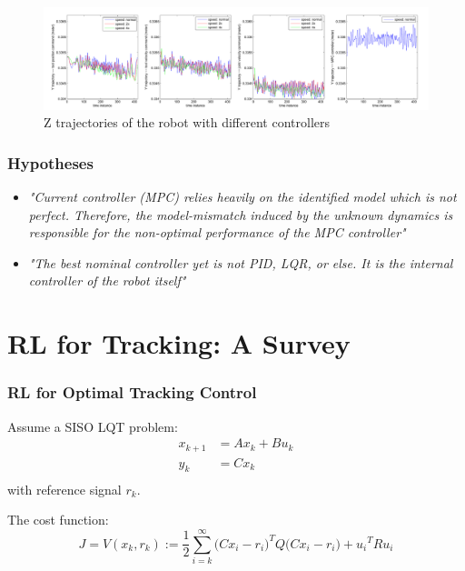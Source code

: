 \documentclass{beamer}
\begin{document}
\begin{frame}
\begin{itemize}
					\begin{figure}
						\centering
						\includegraphics[width=0.9\linewidth]{images/trajectory_data_Z.pdf}
						\caption{\fontsize{8}{4}\selectfont Z trajectories of the robot with different controllers}
						\label{fig:trajectory_data_Z}
					\end{figure}
				\end{itemize}
			\end{frame}		
				
			\begin{frame}\frametitle{Hypotheses}
				\vspace{2mm}
				\begin{itemize}
					\fontsize{8}{4}\selectfont
					\item \textit{"Current controller (MPC) relies heavily on the identified model which is not perfect. Therefore, the model-mismatch induced by the unknown dynamics is responsible for the non-optimal performance of the MPC controller" }
					\vspace{3mm}
					\item \textit{"The best nominal controller yet is not PID, LQR, or else. It is the internal controller of the robot itself"}
					
				\end{itemize}
			\end{frame}
									
			\section{RL for Tracking: A Survey}
			\begin{frame}\frametitle{RL for Optimal Tracking Control}
				
				Assume a SISO LQT problem: \\
				\begin{equation} 
				\begin{split}
				x_{k+1} &= Ax_k + Bu_k \\
				y_k &= Cx_k \\
				\end{split}
				\end{equation}		
				with reference signal $ r_k $. \\
				\vspace{1mm}
				\begin{definition}
					The cost function:
					\begin{equation}
					J = V(x_k, r_k) := \frac{1}{2} \sum_{i=k}^{\infty} \Big(Cx_i-r_i\Big)^TQ\Big(Cx_i-r_i\Big) + {u_i}^TRu_i
					\end{equation}
				\end{definition}
			\end{frame}
			
\end{document}
